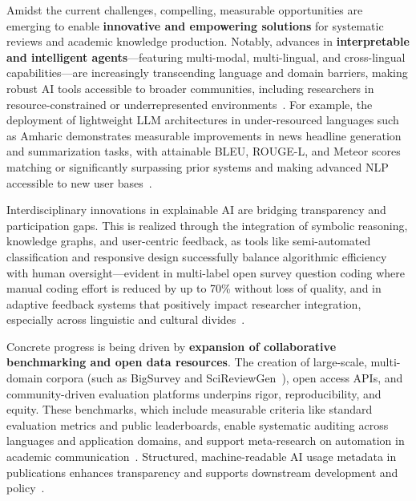 \documentclass[sigconf]{acmart}
\begin{document}
Amidst the current challenges, compelling, measurable opportunities are emerging to enable \textbf{innovative and empowering solutions} for systematic reviews and academic knowledge production. Notably, advances in \textbf{interpretable and intelligent agents}—featuring multi-modal, multi-lingual, and cross-lingual capabilities—are increasingly transcending language and domain barriers, making robust AI tools accessible to broader communities, including researchers in resource-constrained or underrepresented environments~\cite{ref38,ref41,ref61,ref62,ref63,ref64,ref68,ref70,ref76,ref78,ref80,ref81,ref82,ref84,ref86,ref87,ref88,ref89,ref90,ref91,ref92,ref93,ref94,ref95,ref99,ref100,ref102,ref103,ref104,ref105,ref108,ref109,ref110,ref111,ref112,ref113,ref114,ref115,ref117}. For example, the deployment of lightweight LLM architectures in under-resourced languages such as Amharic demonstrates measurable improvements in news headline generation and summarization tasks, with attainable BLEU, ROUGE-L, and Meteor scores matching or significantly surpassing prior systems and making advanced NLP accessible to new user bases~\cite{ref105,ref104}.

Interdisciplinary innovations in explainable AI are bridging transparency and participation gaps. This is realized through the integration of symbolic reasoning, knowledge graphs, and user-centric feedback, as tools like semi-automated classification and responsive design successfully balance algorithmic efficiency with human oversight—evident in multi-label open survey question coding where manual coding effort is reduced by up to 70\% without loss of quality, and in adaptive feedback systems that positively impact researcher integration, especially across linguistic and cultural divides~\cite{ref87,ref88,ref89,ref91,ref108,ref109,ref110,ref111}.

Concrete progress is being driven by \textbf{expansion of collaborative benchmarking and open data resources}. The creation of large-scale, multi-domain corpora (such as BigSurvey and SciReviewGen~\cite{ref62,ref84}), open access APIs, and community-driven evaluation platforms underpins rigor, reproducibility, and equity. These benchmarks, which include measurable criteria like standard evaluation metrics and public leaderboards, enable systematic auditing across languages and application domains, and support meta-research on automation in academic communication~\cite{ref41,ref62,ref63,ref68,ref78,ref80,ref81,ref84,ref86,ref87,ref88,ref89,ref90,ref91,ref94,ref99,ref100,ref103,ref104,ref105,ref108,ref109,ref111,ref112,ref113,ref115,ref117}. Structured, machine-readable AI usage metadata in publications enhances transparency and supports downstream development and policy~\cite{ref110,ref115}.
\end{document}
